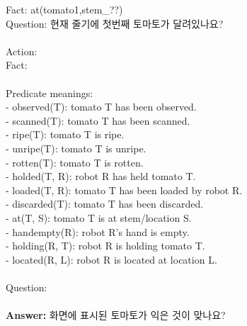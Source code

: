 \begin{tcolorbox}[breakable, title=Prompt for feedback manager (Tomato Harvesting), title filled=false, colback=black!5!white, colframe=black!75!black, left=2pt, right=2pt, top=2pt, bottom=2pt]
Fact: at(tomato1,stem\_??)\\
Question: 현재 줄기에 첫번째 토마토가 달려있나요?\\
\\
Action: \\
Fact: \\
\\
Predicate meanings:\\
- observed(T): tomato T has been observed.\\
- scanned(T): tomato T has been scanned.\\
- ripe(T): tomato T is ripe.\\
- unripe(T): tomato T is unripe.\\
- rotten(T): tomato T is rotten.\\
- holded(T, R): robot R has held tomato T.\\
- loaded(T, R): tomato T has been loaded by robot R.\\
- discarded(T): tomato T has been discarded.\\
- at(T, S): tomato T is at stem/location S.\\
- handempty(R): robot R's hand is empty.\\
- holding(R, T): robot R is holding tomato T.\\
- located(R, L): robot R is located at location L.\\
\\
Question:
\\
\\
\textbf{Answer: } 화면에 표시된 토마토가 익은 것이 맞나요?

\end{tcolorbox}
